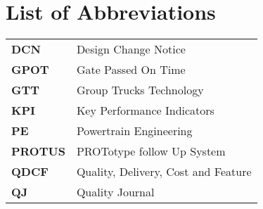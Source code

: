 \thispagestyle{plain}			%
\section*{List of Abbreviations}


\begin{tabular}{ l l }
  
  \textbf{DCN} & Design Change Notice\\ 
  
  \textbf{GPOT} & Gate Passed On Time\\
  
  \textbf{GTT} & Group Trucks Technology\\ 
  
  \textbf{KPI} & Key Performance Indicators\\
  
  \textbf{PE} & Powertrain Engineering\\ 
  
  \textbf{PROTUS} & PROTotype follow Up System\\ 
  
  \textbf{QDCF} & Quality, Delivery, Cost and Feature\\ 
  
  \textbf{QJ} & Quality Journal\\ 
  
  
\end{tabular}

\vspace{1.5cm}
\hfill